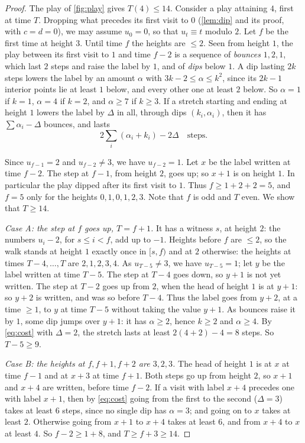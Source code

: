 \documentclass[11pt]{amsart}
\theoremstyle{definition}
\begin{document}
\begin{proof}
The play of \cref{fig:play} gives $T(4)\le14$. Consider a play attaining $4$, first at time $T$. Dropping what precedes
its first visit to $0$ (\cref{lem:dip} and its proof, with $c=d=0$), we may assume $u_0=0$, so that $u_t\equiv t$ modulo $2$. Let $f$ be the
first time at height $3$. Until time $f$ the heights are $\le2$. Seen from height $1$, the play between its first visit to $1$ and time $f-2$ is
a sequence of \emph{bounces} $1,2,1$, which last $2$ steps and raise the label by $1$, and of \emph{dips} below $1$. A
dip lasting $2k$ steps lowers the label by an amount $\alpha$ with $3k-2\le\alpha\le k^2$, since its $2k-1$ interior points
lie at least $1$ below, and every other one at least $2$ below. So $\alpha=1$ if $k=1$, $\alpha=4$ if $k=2$, and
$\alpha\ge7$ if $k\ge3$. If a stretch starting and ending at height $1$ lowers the label by $\Delta$ in all, through dips
$(k_i,\alpha_i)$, then it has $\sum\alpha_i-\Delta$ bounces, and lasts
\begin{equation}\label{eq:cost}
 \textstyle 2\sum_i(\alpha_i+k_i)-2\Delta\quad\text{steps.}
\end{equation}

Since $u_{f-1}=2$ and $u_{f-2}\ne3$, we have $u_{f-2}=1$. Let $x$ be the label written at time $f-2$. The step at $f-1$, from height $2$, goes up; so $x+1$ is
on height $1$. In particular the play dipped after its first visit to $1$. Thus $f\ge1+2+2=5$, and $f=5$ only for the
heights $0,1,0,1,2,3$. Note that $f$ is odd and $T$ even. We show that $T\ge14$.

\emph{Case A: the step at $f$ goes up, $T=f+1$.} It has a witness $s$, at height $2$: the numbers $u_i-2$, for $s\le i<f$, add up to $-1$.
Heights before $f$ are $\le2$, so the walk stands at height $1$ exactly once in $[s,f)$ and at $2$ otherwise: the
heights at times $T-4,\dots,T$ are $2,1,2,3,4$. As $u_{T-5}\ne3$, we have $u_{T-5}=1$; let $y$ be the label written at time $T-5$. The step at
$T-4$ goes down, so $y+1$ is not yet written. The step at $T-2$ goes up from $2$, when the head of height $1$ is at
$y+1$: so $y+2$ is written, and was so before $T-4$. Thus the label goes from $y+2$, at a time $\ge1$, to $y$ at time
$T-5$ without taking the value $y+1$. As bounces raise it by $1$, some dip jumps over $y+1$: it has $\alpha\ge2$, hence
$k\ge2$ and $\alpha\ge4$. By \eqref{eq:cost} with $\Delta=2$, the stretch lasts at least $2(4+2)-4=8$ steps. So
$T-5\ge9$.

\emph{Case B: the heights at $f,f+1,f+2$ are $3,2,3$.} The head of height $1$ is at $x$ at time $f-1$ and at $x+3$ at time
$f+1$. Both steps go up from height $2$, so $x+1$ and $x+4$ are written, before time $f-2$. If a visit with label
$x+4$ precedes one with label $x+1$, then by \eqref{eq:cost} going from the first to the second ($\Delta=3$) takes at
least $6$ steps, since no single dip has $\alpha=3$; and going on to $x$ takes at least $2$. Otherwise going from $x+1$
to $x+4$ takes at least $6$, and from $x+4$ to $x$ at least $4$. So $f-2\ge1+8$, and $T\ge f+3\ge14$.


\end{proof}
\end{document}
